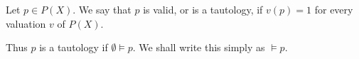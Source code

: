 Let $p \in P(X)$. We say that $p$ is valid, or is a tautology, if $v(p) = 1$ for every valuation $v$ of $P(X)$.

Thus $p$ is a tautology if $\emptyset \models p$. We shall write this simply as $\models p$.

